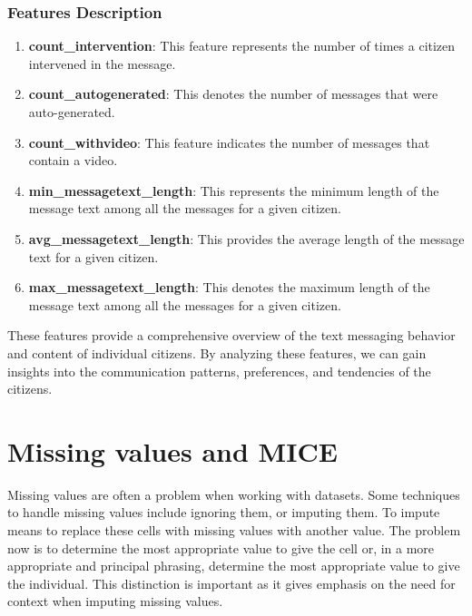 \documentclass[12pt]{article}
\begin{document}
\subsubsection{Features Description}

\begin{enumerate}
    \item \textbf{count\_intervention}: This feature represents the number of times a citizen intervened in the message.
    
    \item \textbf{count\_autogenerated}: This denotes the number of messages that were auto-generated.
    
    \item \textbf{count\_withvideo}: This feature indicates the number of messages that contain a video.
    
    \item \textbf{min\_messagetext\_length}: This represents the minimum length of the message text among all the messages for a given citizen.
    
    \item \textbf{avg\_messagetext\_length}: This provides the average length of the message text for a given citizen.
    
    \item \textbf{max\_messagetext\_length}: This denotes the maximum length of the message text among all the messages for a given citizen.
\end{enumerate}

These features provide a comprehensive overview of the text messaging behavior and content of individual citizens. By analyzing these features, we can gain insights into the communication patterns, preferences, and tendencies of the citizens.

\section{Missing values and MICE}

\label{s.missing}
 
	Missing values are often a problem when working with datasets. Some techniques to handle missing values include ignoring them, or imputing them. To impute means to replace these cells with missing values with another value. The problem now is to determine the most appropriate value to give the cell or, in a more appropriate and principal phrasing, determine the most appropriate value to give the individual. This distinction is important as it gives emphasis on the need for context when imputing missing values.
	
\end{document}

